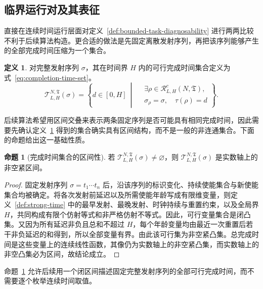 \documentclass[master,fontset=ubuntu]{shnuthesis}
\theoremstyle{definition}
\newtheorem{thesisdefinition}{定义}
\newtheorem{thesisproposition}{命题}
\begin{document}
\subsection{临界运行对及其表征}

直接在连续时间运行层面对定义~\ref{def:bounded-task-diagnosability} 进行两两比较不利于后续算法构造。更合适的做法是先固定离散发射序列，再把该序列能够产生的全部完成时间压缩为一个集合。

\begin{thesisdefinition}
\label{def:completion-time-set}
对完整发射序列 \(\sigma\)，其在时间界 \(H\) 内的可行完成时间集合定义为式~\eqref{eq:completion-time-set}。
\begin{equation}
\mathcal T_{L,H}^{N,\mathfrak T}(\sigma)
=
\left\{
d\in[0,H]\ \middle|\
\begin{aligned}
&\exists\rho\in\mathcal R^c_{L,H}(N,\mathfrak T),\\
&\sigma_\rho=\sigma,\quad
\tau(\rho)=d
\end{aligned}
\right\}.
\label{eq:completion-time-set}
\end{equation}
\end{thesisdefinition}

后续算法希望用区间交叠来表示两条固定序列是否可能具有相同完成时间，因此需要先确认定义~\ref{def:completion-time-set} 得到的集合确实具有区间结构，而不是一般的非连通集合。下面的命题给出这一基础性质。

\begin{thesisproposition}[完成时间集合的区间性]
\label{prop:completion-time-interval}
若 \(\mathcal T_{L,H}^{N,\mathfrak T}(\sigma)\neq\varnothing\)，则 \(\mathcal T_{L,H}^{N,\mathfrak T}(\sigma)\) 是实数轴上的非空紧区间。
\end{thesisproposition}

\begin{proof}
固定发射序列 \(\sigma=t_1\cdots t_n\) 后，沿该序列的标识变化、持续使能集合与新使能集合均被确定。将各次发射前延迟以及所需使能年龄写成有限维变量，则定义~\ref{def:strong-time} 中的最早发射、最晚发射、时钟持续与重置约束，以及全局界 \(H\)，共同构成有限个仿射等式和非严格仿射不等式。因此，可行变量集合是闭凸集。又因为所有延迟非负且总和不超过 \(H\)，每个年龄变量均由最近一次重置后若干非负延迟的和得到，所以全部变量有界。由此该可行集为非空紧凸集。总完成时间是这些变量上的连续线性函数，其像仍为实数轴上的非空紧凸集，而实数轴上的非空凸集必为区间，故结论成立。
\end{proof}

命题~\ref{prop:completion-time-interval} 允许后续用一个闭区间描述固定完整发射序列的全部可行完成时间，而不需要逐个枚举连续时间取值。
\end{document}
